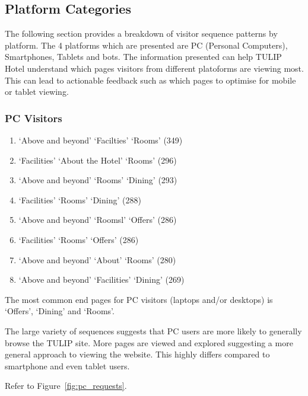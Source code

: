 \subsection{Platform Categories}
\label{sec:results:platform}

The following section provides a breakdown of visitor sequence patterns by platform. The 4 platforms which are presented are PC (Personal Computers), Smartphones, Tablets and bots. The information presented can help TULIP Hotel understand which pages visitors from different platoforms are viewing most. This can lead to actionable feedback such as which pages to optimise for mobile or tablet viewing.

\subsubsection{PC Visitors}
\label{sec:results:platform:pc}

\begin{enumerate}
  \item `Above and beyond' \ra{} `Facilties' \ra{} `Rooms' (349)
  \item `Facilities' \ra{} `About the Hotel' \ra{} `Rooms' (296)
  \item `Above and beyond' \ra{} `Rooms' \ra{} `Dining' (293)
  \item `Facilities' \ra{} `Rooms' \ra{} `Dining' (288)
  \item `Above and beyond' \ra{} `Roomsl' \ra{} `Offers' (286)
  \item `Facilities' \ra{} `Rooms' \ra{} `Offers' (286)
  \item `Above and beyond' \ra{} `About' \ra{} `Rooms' (280)
  \item `Above and beyond' \ra{} `Facilities' \ra{} `Dining' (269)
\end{enumerate}

The most common end pages for PC visitors (laptops and/or desktops) is `Offers', `Dining' and `Rooms'. 

The large variety of sequences suggests that PC users are more likely to generally browse the TULIP site. More pages are viewed and explored suggesting a more general approach to viewing the website. This highly differs compared to smartphone and even tablet users.

Refer to Figure~\ref{fig:pc_requests}.

\begin{landscape}
\pagestyle{empty}
\end{landscape}


